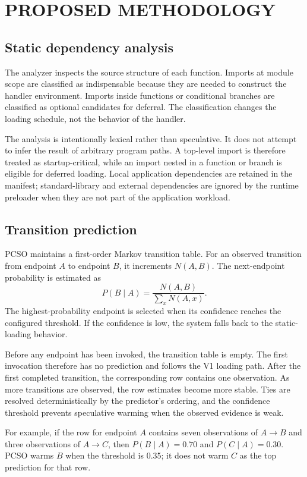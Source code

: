 \documentclass[12pt]{report}
\begin{document}
\chapter{PROPOSED METHODOLOGY}
\section{Static dependency analysis}
The analyzer inspects the source structure of each function. Imports at module scope are classified as indispensable because they are needed to construct the handler environment. Imports inside functions or conditional branches are classified as optional candidates for deferral. The classification changes the loading schedule, not the behavior of the handler.

The analysis is intentionally lexical rather than speculative. It does not attempt to infer the result of arbitrary program paths. A top-level import is therefore treated as startup-critical, while an import nested in a function or branch is eligible for deferred loading. Local application dependencies are retained in the manifest; standard-library and external dependencies are ignored by the runtime preloader when they are not part of the application workload.

\section{Transition prediction}
PCSO maintains a first-order Markov transition table. For an observed transition from endpoint $A$ to endpoint $B$, it increments $N(A,B)$. The next-endpoint probability is estimated as
\begin{equation}
P(B\mid A)=\frac{N(A,B)}{\sum_x N(A,x)}.
\end{equation}
The highest-probability endpoint is selected when its confidence reaches the configured threshold. If the confidence is low, the system falls back to the static-loading behavior.

Before any endpoint has been invoked, the transition table is empty. The first invocation therefore has no prediction and follows the V1 loading path. After the first completed transition, the corresponding row contains one observation. As more transitions are observed, the row estimates become more stable. Ties are resolved deterministically by the predictor's ordering, and the confidence threshold prevents speculative warming when the observed evidence is weak.

For example, if the row for endpoint $A$ contains seven observations of $A\rightarrow B$ and three observations of $A\rightarrow C$, then $P(B\mid A)=0.70$ and $P(C\mid A)=0.30$. PCSO warms $B$ when the threshold is 0.35; it does not warm $C$ as the top prediction for that row.
\end{document}
